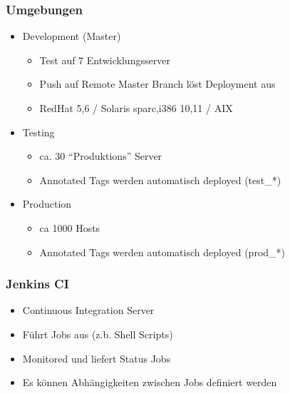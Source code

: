 \documentclass{beamer}
\begin{document}

\begin{frame}
\end{frame}

\begin{frame}
  \frametitle{Umgebungen}

    \begin{itemize}
    \item Development (Master)
      \begin{itemize}
      \item Test auf 7 Entwicklungsserver
      \item Push auf Remote Master Branch löst Deployment aus
      \item RedHat 5,6 / Solaris {sparc,i386} {10,11} / AIX
      \end{itemize}
    \item Testing
      \begin{itemize}
      \item ca. 30 ``Produktions'' Server
      \item Annotated Tags werden automatisch deployed (test\_*)
      \end{itemize}
    \item Production
      \begin{itemize}
      \item ca 1000 Hosts
      \item Annotated Tags werden automatisch deployed (prod\_*)
      \end{itemize}
    \end{itemize}
\end{frame}

\begin{frame}
  \frametitle{Jenkins CI}

  \begin{itemize}
  \item Continuous Integration Server
  \item Führt Jobs aus (z.b. Shell Scripts)
  \item Monitored und liefert Status Jobs
  \item Es können Abhängigkeiten zwischen Jobs definiert werden
  \end{itemize}
\end{frame}
\end{document}

